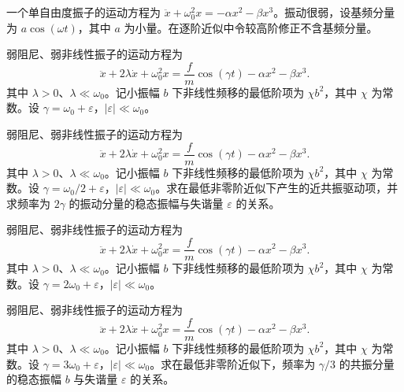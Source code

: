 \noindent\begin{minipage}{\textwidth}
一个单自由度振子的运动方程为 $\ddot{x}+\omega_0^2x=-\alpha x^2-\beta x^3$。振动很弱，设基频分量为 $a\cos(\omega t)$，其中 $a$ 为小量。在逐阶近似中令较高阶修正不含基频分量。
\end{minipage}\par\vfill
\noindent\begin{minipage}{\textwidth}
弱阻尼、弱非线性振子的运动方程为
\[
\ddot{x}+2\lambda\dot{x}+\omega_0^2x=\frac{f}{m}\cos(\gamma t)-\alpha x^2-\beta x^3.
\]
其中 $\lambda>0$、$\lambda\ll\omega_0$。记小振幅 $b$ 下非线性频移的最低阶项为 $\chi b^2$，其中 $\chi$ 为常数。设 $\gamma=\omega_0+\varepsilon$，$\lvert\varepsilon\rvert\ll\omega_0$。
\end{minipage}\par\vfill
\newpage
\noindent\begin{minipage}{\textwidth}
弱阻尼、弱非线性振子的运动方程为
\[
\ddot{x}+2\lambda\dot{x}+\omega_0^2x=\frac{f}{m}\cos(\gamma t)-\alpha x^2-\beta x^3.
\]
其中 $\lambda>0$、$\lambda\ll\omega_0$。记小振幅 $b$ 下非线性频移的最低阶项为 $\chi b^2$，其中 $\chi$ 为常数。设 $\gamma=\omega_0/2+\varepsilon$，$\lvert\varepsilon\rvert\ll\omega_0$。求在最低非零阶近似下产生的近共振驱动项，并求频率为 $2\gamma$ 的振动分量的稳态振幅与失谐量 $\varepsilon$ 的关系。
\end{minipage}\par\vfill
\noindent\begin{minipage}{\textwidth}
弱阻尼、弱非线性振子的运动方程为
\[
\ddot{x}+2\lambda\dot{x}+\omega_0^2x=\frac{f}{m}\cos(\gamma t)-\alpha x^2-\beta x^3.
\]
其中 $\lambda>0$、$\lambda\ll\omega_0$。记小振幅 $b$ 下非线性频移的最低阶项为 $\chi b^2$，其中 $\chi$ 为常数。设 $\gamma=2\omega_0+\varepsilon$，$\lvert\varepsilon\rvert\ll\omega_0$。
\end{minipage}\par\vfill
\newpage
\noindent\begin{minipage}{\textwidth}
弱阻尼、弱非线性振子的运动方程为
\[
\ddot{x}+2\lambda\dot{x}+\omega_0^2x=\frac{f}{m}\cos(\gamma t)-\alpha x^2-\beta x^3.
\]
其中 $\lambda>0$、$\lambda\ll\omega_0$。记小振幅 $b$ 下非线性频移的最低阶项为 $\chi b^2$，其中 $\chi$ 为常数。设 $\gamma=3\omega_0+\varepsilon$，$\lvert\varepsilon\rvert\ll\omega_0$。求在最低非零阶近似下，频率为 $\gamma/3$ 的共振分量的稳态振幅 $b$ 与失谐量 $\varepsilon$ 的关系。
\end{minipage}\par\vfill
